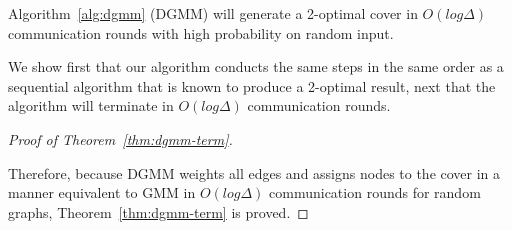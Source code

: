 \begin{thm}
  Algorithm~\ref{alg:dgmm} (DGMM) will generate a 2-optimal cover in $O(log \Delta)$ communication rounds with high probability on random input.
\label{thm:dgmm-term}
\end{thm}
\begin{smy}
We show first that our algorithm conducts the same steps in the same order as a sequential algorithm that is known to produce a 2-optimal result, next that the algorithm will terminate in $O(log \Delta)$ communication rounds.
\end{smy} 


\begin{proof}[Proof of Theorem~\ref{thm:dgmm-term}]
\label{prf:correct}




Therefore, because DGMM weights all edges and assigns nodes to the cover in a manner equivalent to GMM in $O(log \Delta)$ communication rounds for random graphs, Theorem~\ref{thm:dgmm-term} is proved.
\end{proof}
